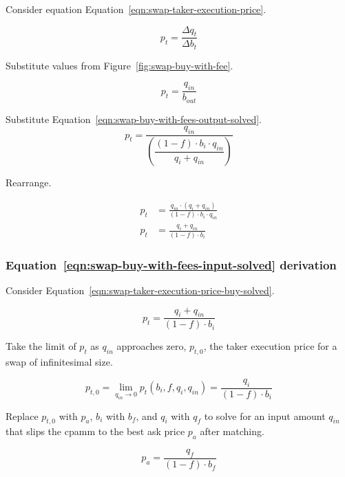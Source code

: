 \documentclass[table, twocolumn]{article}
\begin{document}
Consider equation Equation~\ref{eqn:swap-taker-execution-price}.

\begin{equation}
  p_t = \frac{\Delta q_t}{\Delta b_t}
\end{equation}

Substitute values from Figure~\ref{fig:swap-buy-with-fee}.

\begin{equation}
  p_t = \frac{q_{in}}{b_{out}}
\end{equation}

Substitute Equation~\ref{eqn:swap-buy-with-fees-output-solved}.
\begin{equation}
  p_t = \frac{q_{in}}{\left(\dfrac{(1 - f) \cdot b_i \cdot q_{in}}{q_i + q_{in}}\right)}
\end{equation}

Rearrange.

\begin{align}
  p_t & =
  \frac{q_{in} \cdot (q_i + q_{in})}{(1 - f) \cdot b_i \cdot q_{in}} \nonumber \\
  p_t & = \frac{q_i + q_{in}}{(1 - f) \cdot b_i} \nonumber
\end{align}

\subsubsection{Equation~\ref{eqn:swap-buy-with-fees-input-solved} derivation}%
\label{sssec:equation-eqn-swap-buy-with-fees-input-solved-derivation}

Consider Equation~\ref{eqn:swap-taker-execution-price-buy-solved}.

\begin{equation}
  p_t = \frac{q_i + q_{in}}{(1 - f) \cdot b_i} \nonumber
\end{equation}

Take the limit of $p_t$ as $q_{in}$ approaches zero, $p_{t, 0}$, the taker execution
price for a swap of infinitesimal size.

\begin{equation}
  p_{t, 0} = \lim_{q_{in} \to 0} p_t (b_i, f, q_i, q_{in}) =
  \frac{q_i}{(1 - f) \cdot b_i} \nonumber
\end{equation}

Replace $p_{t, 0}$ with $p_a$, $b_i$ with $b_f$, and $q_i$ with $q_f$ to solve for an
input amount $q_{in}$ that slips the \gls*{cpamm} to the best ask price $p_a$ after
matching.

\begin{equation}
  p_a = \frac{q_f}{(1 - f) \cdot b_f} \nonumber
\end{equation}
\end{document}
